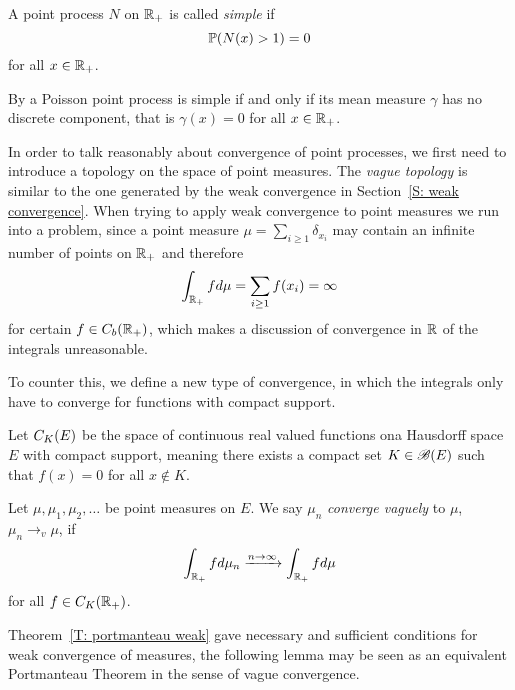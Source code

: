 \begin{definition} \label{D: simple point process}
	A point process $N$ on $\mathbb{R}_+$ is called \emph{simple} if 
	\begin{equation}
		\mathbb{P}( N({x}) > 1 ) = 0
	\end{equation}
	for all $x \in \mathbb{R}_+$.
\end{definition}

By \cite[Remark 2.1, p.34]{Haenggi.2013} a Poisson point process is simple if and only if
its mean measure $\gamma$ has no discrete component,
that is $\gamma(x) = 0$ for all $x \in \mathbb{R}_+$.

In order to talk reasonably about convergence of point processes,
we first need to introduce a topology on the space of point measures.
The \emph{vague topology} is similar to the one generated by the weak convergence in Section~\ref{S: weak convergence}.
When trying to apply weak convergence to point measures we run into a problem,
since a point measure $\mu = \sum_{i \geq 1} \delta_{x_i}$ may contain an infinite number of points on $\mathbb{R}_+$
and therefore
\begin{equation*}
	\int_{\mathbb{R}_+} fd\mu = \sum_{i \geq 1} f(x_i) = \infty
\end{equation*}
for certain $f \in C_b(\mathbb{R}_+)$, which makes a discussion of convergence in $\mathbb{R}$ of the integrals unreasonable.

To counter this, we define a new type of convergence, 
in which the integrals only have to converge for functions with compact support.

\begin{definition} \label{D: vague convergence}
	Let $C_K(E)$ be the space of continuous real valued functions ona Hausdorff space $E$ with compact support,
	meaning there exists a compact set $K \in \mathscr{B}(E)$ such that $f(x) = 0$ for all $x \notin K$.
	
	Let $\mu, \mu_1, \mu_2, \dots$ be point measures on  $E$.
	We say $\mu_n$ \emph{converge vaguely} to $\mu$, $\mu_n \rightarrow_v \mu$, if
	\begin{equation}
		\int_{\mathbb{R}_+} fd\mu_n \xrightarrow{n \rightarrow \infty} \int_{\mathbb{R}_+} fd\mu
	\end{equation}
	for all $f \in C_K(\mathbb{R}_+)$.
\end{definition}

Theorem~\ref{T: portmanteau weak} gave necessary and sufficient conditions for weak convergence of measures,
the following lemma may be seen as an equivalent Portmanteau Theorem in the sense of vague convergence.

